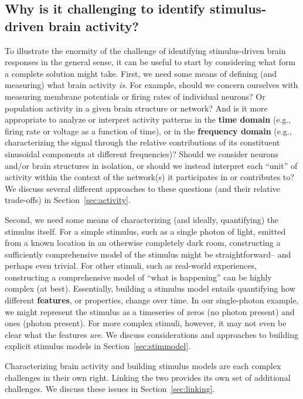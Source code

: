 \documentclass[runningheads]{llncs}
\begin{document}
\subsection{Why is it challenging to identify stimulus-driven brain
  activity?}
To illustrate the enormity of the challenge of identifying
stimulus-driven brain responses in the general sense, it can be useful
to start by considering what form a complete solution might take.
First, we need some means of defining (and measuring) what brain
activity \textit{is}.  For example, should we concern ourselves with
measuring membrane potentials or firing rates of individual neurons?
Or population activity in a given brain structure or network?  And is
it more appropriate to analyze or interpret activity patterns in the
\textbf{time domain} (e.g., firing rate or voltage as a function of
time), or in the \textbf{frequency domain} (e.g., characterizing the
signal through the relative contributions of its constituent
sinusoidal components at different frequencies)?  Should we consider
neurons and/or brain structures in isolation, or should we instead
interpret each ``unit'' of activity within the context of the
network(s) it participates in or contributes to?  We discuss several
different approaches to these questions (and their relative
trade-offs) in Section~\ref{sec:activity}.

Second, we need some means of characterizing (and ideally,
quantifying) the stimulus itself.  For a simple stimulus, such as a
single photon of light, emitted from a known location in an otherwise
completely dark room, constructing a sufficiently comprehensive model
of the stimulus might be straightforward-- and perhaps even trivial.
For other stimuli, such as real-world experiences, constructing a
comprehensive model of ``what is happening'' can be highly complex (at
best).  Essentially, building a stimulus model entails quantifying how
different \textbf{features}, or properties, change over time.  In our
single-photon example, we might represent the stimulus as a timeseries
of zeros (no photon present) and ones (photon present).  For more
complex stimuli, however, it may not even be clear what the features
\textit{are}.  We discuss considerations and approaches to building
explicit stimulus models in Section~\ref{sec:stimmodel}.

Characterizing brain activity and building stimulus models are each
complex challenges in their own right.  Linking the two provides its
own set of additional challenges.  We discuss these issues in
Section~\ref{sec:linking}.
\end{document}
